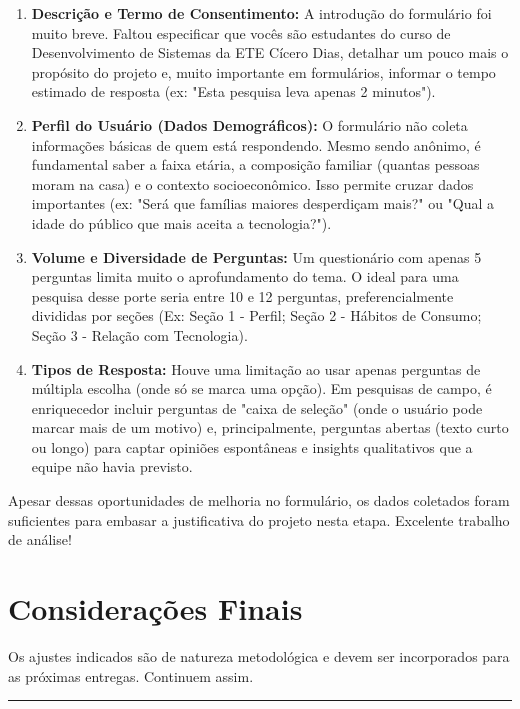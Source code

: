 \documentclass[
  sigconf,
  nonacm, %
  language=portuguese
]{acmart}
\begin{document}
\begin{enumerate}[leftmargin=14pt,itemsep=2pt,topsep=4pt]
  \item \textbf{Descrição e Termo de Consentimento:} A introdução do formulário foi muito breve. Faltou especificar que vocês são estudantes do curso de Desenvolvimento de Sistemas da ETE Cícero Dias, detalhar um pouco mais o propósito do projeto e, muito importante em formulários, informar o tempo estimado de resposta (ex: "Esta pesquisa leva apenas 2 minutos").
  \item \textbf{Perfil do Usuário (Dados Demográficos):} O formulário não coleta informações básicas de quem está respondendo. Mesmo sendo anônimo, é fundamental saber a faixa etária, a composição familiar (quantas pessoas moram na casa) e o contexto socioeconômico. Isso permite cruzar dados importantes (ex: "Será que famílias maiores desperdiçam mais?" ou "Qual a idade do público que mais aceita a tecnologia?").
  \item \textbf{Volume e Diversidade de Perguntas:} Um questionário com apenas 5 perguntas limita muito o aprofundamento do tema. O ideal para uma pesquisa desse porte seria entre 10 e 12 perguntas, preferencialmente divididas por seções (Ex: Seção 1 - Perfil; Seção 2 - Hábitos de Consumo; Seção 3 - Relação com Tecnologia).
  \item \textbf{Tipos de Resposta:} Houve uma limitação ao usar apenas perguntas de múltipla escolha (onde só se marca uma opção). Em pesquisas de campo, é enriquecedor incluir perguntas de "caixa de seleção" (onde o usuário pode marcar mais de um motivo) e, principalmente, perguntas abertas (texto curto ou longo) para captar opiniões espontâneas e insights qualitativos que a equipe não havia previsto.
\end{enumerate}

Apesar dessas oportunidades de melhoria no formulário, os dados coletados foram suficientes para embasar a justificativa do projeto nesta etapa. Excelente trabalho de análise!

\section{Considerações Finais}

Os ajustes indicados são de natureza metodológica e devem ser
incorporados para as próximas entregas.
Continuem assim.


\vspace{1.5em}
\noindent\rule{\linewidth}{0.4pt}
\end{document}
